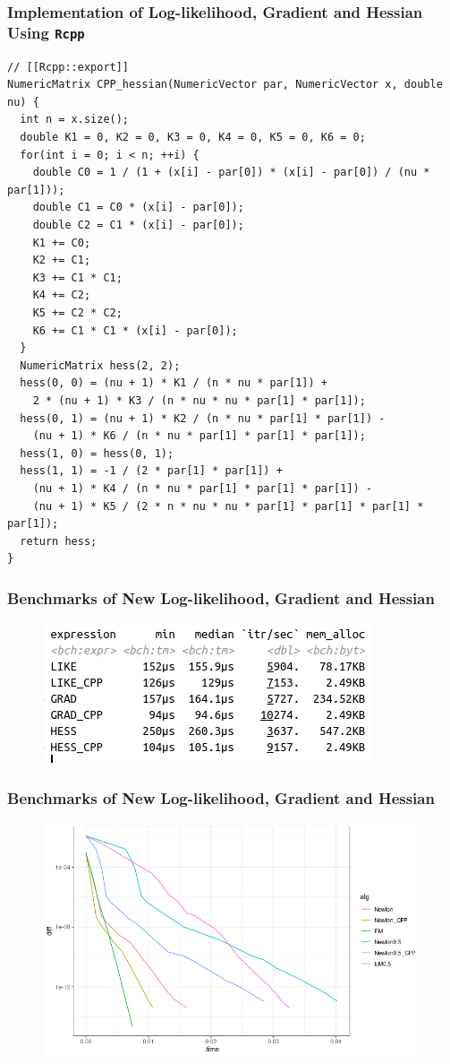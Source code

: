 \documentclass[aspectratio=169]{beamer}
\begin{document}
\begin{frame}[fragile]
    \frametitle{Implementation of Log-likelihood, Gradient and Hessian Using \texttt{Rcpp}}
\begin{verbatim}
// [[Rcpp::export]]
NumericMatrix CPP_hessian(NumericVector par, NumericVector x, double nu) {
  int n = x.size();
  double K1 = 0, K2 = 0, K3 = 0, K4 = 0, K5 = 0, K6 = 0;
  for(int i = 0; i < n; ++i) {
    double C0 = 1 / (1 + (x[i] - par[0]) * (x[i] - par[0]) / (nu * par[1]));
    double C1 = C0 * (x[i] - par[0]);
    double C2 = C1 * (x[i] - par[0]);
    K1 += C0;
    K2 += C1;
    K3 += C1 * C1;
    K4 += C2;
    K5 += C2 * C2;
    K6 += C1 * C1 * (x[i] - par[0]);
  }
  NumericMatrix hess(2, 2);
  hess(0, 0) = (nu + 1) * K1 / (n * nu * par[1]) +
    2 * (nu + 1) * K3 / (n * nu * nu * par[1] * par[1]);
  hess(0, 1) = (nu + 1) * K2 / (n * nu * par[1] * par[1]) -
    (nu + 1) * K6 / (n * nu * par[1] * par[1] * par[1]);
  hess(1, 0) = hess(0, 1);
  hess(1, 1) = -1 / (2 * par[1] * par[1]) +
    (nu + 1) * K4 / (n * nu * par[1] * par[1] * par[1]) -
    (nu + 1) * K5 / (2 * n * nu * nu * par[1] * par[1] * par[1] * par[1]);
  return hess;
}
\end{verbatim}
\end{frame}
\begin{frame}
    \frametitle{Benchmarks of New Log-likelihood, Gradient and Hessian}    
    \begin{figure}
        \centering
        \includegraphics[scale = 0.6]{figure/CPP_LogGrHess.png}
    \end{figure}
\end{frame}
\begin{frame}
    \frametitle{Benchmarks of New Log-likelihood, Gradient and Hessian}
    \begin{figure}
        \centering
        \includegraphics[scale = 0.5]{figure/CPPN_NewtonVsEm.png}
    \end{figure}
\end{frame}
\end{document}
